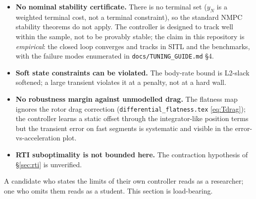 \documentclass[11pt]{article}
\begin{document}
\begin{itemize}
  \item \textbf{No nominal stability certificate.} There is no terminal set
        ($y_N$ is a weighted terminal cost, not a terminal constraint), so the standard
        NMPC stability theorems do not apply. The controller is designed to track well
        within the sample, not to be provably stable; the claim in this repository is
        \emph{empirical}: the closed loop converges and tracks in SITL and the benchmarks,
        with the failure modes enumerated in \texttt{docs/TUNING\_GUIDE.md} \S4.
  \item \textbf{Soft state constraints can be violated.} The body-rate bound is L2-slack
        softened; a large transient violates it at a penalty, not at a hard wall.
  \item \textbf{No robustness margin against unmodelled drag.} The flatness map ignores the
        rotor drag correction (\texttt{differential\_flatness.tex} \eqref{eq:Tdrag}); the
        controller learns a static offset through the integrator-like position terms but the
        transient error on fast segments is systematic and visible in the
        error-vs-acceleration plot.
  \item \textbf{RTI suboptimality is not bounded here.} The contraction hypothesis of
        \S\ref{sec:rti} is unverified.
\end{itemize}

A candidate who states the limits of their own controller reads as a researcher; one who
omits them reads as a student. This section is load-bearing.



\end{document}
